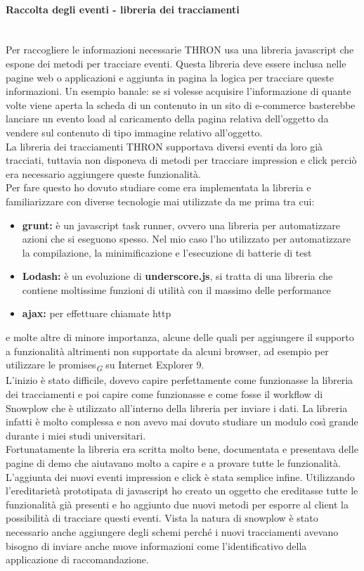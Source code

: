 \documentclass[a4paper, 12pt, twoside, openright]{book}
\newcommand{\gloss}[1]{#1\textsubscript{\textit{\tiny{G}}}}
\begin{document}
\paragraph{Raccolta degli eventi - libreria dei tracciamenti}\mbox{} \\
Per raccogliere le informazioni necessarie THRON usa una libreria javascript che espone dei metodi per tracciare eventi. Questa libreria deve essere inclusa nelle pagine web o applicazioni e aggiunta in pagina la logica per tracciare queste informazioni. Un esempio banale: se si volesse acquisire l'informazione di quante volte viene aperta la scheda di un contenuto in un sito di e-commerce basterebbe lanciare un evento load al caricamento della pagina relativa dell'oggetto da vendere sul contenuto di tipo immagine relativo all'oggetto.\\
La libreria dei tracciamenti THRON supportava diversi eventi da loro già tracciati, tuttavia non disponeva di metodi per tracciare impression e click perciò era necessario aggiungere queste funzionalità.\\
Per fare questo ho dovuto studiare come era implementata la libreria e familiarizzare con diverse tecnologie mai utilizzate da me prima tra cui:
\begin{itemize}
\item \textbf{grunt:} è un javascript task runner, ovvero una libreria per automatizzare azioni che si eseguono spesso. Nel mio caso l'ho utilizzato per automatizzare la compilazione, la minimificazione e l'esecuzione di batterie di test
\item \textbf{Lodash:} è un evoluzione di \textbf{underscore.js}, si tratta di una libreria che contiene moltissime funzioni di utilità con il massimo delle performance
\item \textbf{ajax:} per effettuare chiamate http
\end{itemize}
e molte altre di minore importanza, alcune delle quali per aggiungere il supporto a funzionalità altrimenti non supportate da alcuni browser, ad esempio per utilizzare le \gloss{promises} su Internet Explorer 9.\\
L'inizio è stato difficile, dovevo capire perfettamente come funzionasse la libreria dei tracciamenti e poi capire come funzionasse e come fosse il workflow di Snowplow che è utilizzato all'interno della libreria per inviare i dati. La libreria infatti è molto complessa e non avevo mai dovuto studiare un modulo così grande durante i miei studi universitari.\\
Fortunatamente la libreria era scritta molto bene, documentata e presentava delle pagine di demo che aiutavano molto a capire e a provare tutte le funzionalità. L'aggiunta dei nuovi eventi impression e click è stata semplice infine. Utilizzando l'ereditarietà prototipata di javascript ho creato un oggetto che ereditasse tutte le funzionalità già presenti e ho aggiunto due nuovi metodi per esporre al client la possibilità di tracciare questi eventi. Vista la natura di snowplow è stato necessario anche aggiungere degli schemi perché i nuovi tracciamenti avevano bisogno di inviare anche nuove informazioni come l'identificativo della applicazione di raccomandazione.\\
\end{document}
